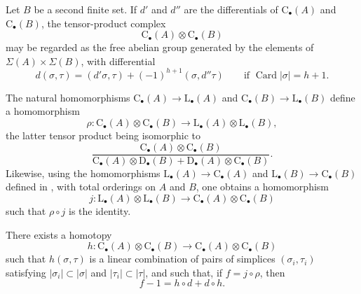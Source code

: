 \begin{env}[11.8.2]
\label{0.11.8.2}
Let $B$ be a second finite set.
If $d'$ and $d''$ are the differentials of
$\mathrm{C}_\bullet(A)$ and $\mathrm{C}_\bullet(B)$, the tensor-product
complex
\[
  \mathrm{C}_\bullet(A)\otimes\mathrm{C}_\bullet(B)
\]
may be regarded as the free abelian group generated by the elements of
$\Sigma(A)\times\Sigma(B)$, with differential
\[
  d(\sigma,\tau)
  =
  (d'\sigma,\tau)+(-1)^{h+1}(\sigma,d''\tau)
  \qquad\text{if }\operatorname{Card}|\sigma|=h+1.
\]

The natural homomorphisms
$\mathrm{C}_\bullet(A)\to\mathrm{L}_\bullet(A)$ and
$\mathrm{C}_\bullet(B)\to\mathrm{L}_\bullet(B)$ define a homomorphism
\[
  \rho:
  \mathrm{C}_\bullet(A)\otimes\mathrm{C}_\bullet(B)
  \longrightarrow
  \mathrm{L}_\bullet(A)\otimes\mathrm{L}_\bullet(B),
\]
the latter tensor product being isomorphic to
\[
  \frac{\mathrm{C}_\bullet(A)\otimes\mathrm{C}_\bullet(B)}
  {\mathrm{C}_\bullet(A)\otimes\mathrm{D}_\bullet(B)
   +\mathrm{D}_\bullet(A)\otimes\mathrm{C}_\bullet(B)}.
\]
Likewise, using the homomorphisms
$\mathrm{L}_\bullet(A)\to\mathrm{C}_\bullet(A)$ and
$\mathrm{L}_\bullet(B)\to\mathrm{C}_\bullet(B)$ defined in
, with total orderings on $A$ and $B$, one obtains a
homomorphism
\[
  j:
  \mathrm{L}_\bullet(A)\otimes\mathrm{L}_\bullet(B)
  \longrightarrow
  \mathrm{C}_\bullet(A)\otimes\mathrm{C}_\bullet(B)
\]
such that $\rho\circ j$ is the identity.
\end{env}

\begin{proposition}[11.8.3]
\label{0.11.8.3}
There exists a homotopy
\[
  h:
  \mathrm{C}_\bullet(A)\otimes\mathrm{C}_\bullet(B)
  \longrightarrow
  \mathrm{C}_\bullet(A)\otimes\mathrm{C}_\bullet(B)
\]
such that $h(\sigma,\tau)$ is a linear combination of pairs of simplices
$(\sigma_i,\tau_i)$ satisfying
$|\sigma_i|\subset|\sigma|$ and $|\tau_i|\subset|\tau|$, and such that,
if $f=j\circ\rho$, then
\[
  f-1=h\circ d+d\circ h.
  \tag{11.8.3.1}\label{0.11.8.3.1}
\]
\end{proposition}

